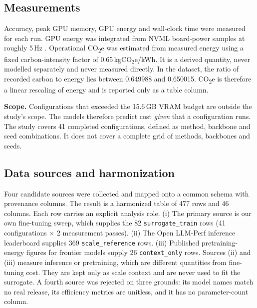 \documentclass[conference]{IEEEtran}
\newcommand{\COtwo}{CO\textsubscript{2}e}
\begin{document}
\subsection{Measurements}

Accuracy, peak GPU memory, GPU energy and wall-clock time were measured for each run. GPU
energy was integrated from NVML board-power samples at roughly 5\,Hz \cite{nvml}. %
Operational \COtwo{} was estimated from measured energy using a fixed carbon-intensity factor
of 0.65\,kgCO$_2$e/kWh. It is a derived quantity, never modelled separately and never
measured directly. %
In the dataset, the ratio of recorded carbon to energy lies between 0.649988 and 0.650015.
\COtwo{} is therefore a linear rescaling of energy and is reported only as a table column.

\textbf{Scope.} Configurations that exceeded the 15.6\,GB VRAM budget are outside the study's
scope. The models therefore predict cost \emph{given} that a configuration runs. %
The study covers 41 completed configurations, defined as method, backbone and seed
combinations. %
It does not cover a complete grid of methods, backbones and seeds.

\subsection{Data sources and harmonization}

Four candidate sources were collected and mapped onto a common schema with provenance
columns. The result is a harmonized table of 477 rows and 46 columns. %
Each row carries an explicit analysis role.
(i) The primary source is our own fine-tuning sweep, which supplies the 82
\texttt{surrogate\_train} rows (41 configurations $\times$ 2 measurement passes).
(ii) The Open LLM-Perf inference leaderboard supplies 369 \texttt{scale\_reference} rows.
(iii) Published pretraining-energy figures for frontier models supply 26
\texttt{context\_only} rows. %
Sources (ii) and (iii) measure inference or pretraining, which are different quantities from
fine-tuning cost. They are kept only as scale context and are never used to fit the
surrogate. A fourth source was rejected on three grounds: its model names match no real
release, its efficiency metrics are unitless, and it has no parameter-count column. %
\end{document}
